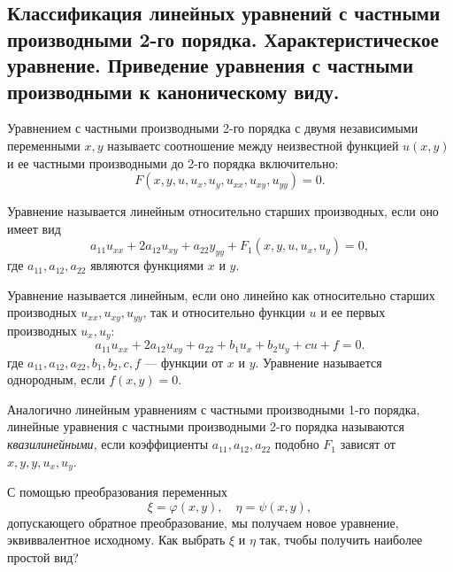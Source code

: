 \subsection{Классификация линейных уравнений с частными производными 2-го порядка. Характеристическое уравнение. Приведение уравнения с частными производными к каноническому виду.}

Уравнением с частными производными 2-го порядка с двумя независимыми переменными $x, y$ называетс соотношение между неизвестной функцией $ u(x, y)$ и ее частными производными до 2-го порядка включительно:
\begin{equation}
	F(x, y, u, u_x, u_y, u_{xx}, u_{xy}, u_{yy}) = 0.
\end{equation}

Уравнение называется линейным относительно старших производных, если оно имеет вид
\begin{equation} \label{SOlineq}
	a_{11} u_{xx} + 2 a_{12} u_{xy} + a_{22} y_{yy} + F_1(x, y, u, u_x, u_y) = 0,
\end{equation}
где $a_{11}, a_{12}, a_{22}$ являются функциями $x$ и $y$.

Уравнение называется линейным, если оно линейно как относительно старших производных $u_{xx}, u_{xy}, u_{yy}$, так и относительно функции $u$ и ее первых производных $u_x, u_y$:
\begin{equation} \label{SOeq}
	a_{11}  u_{xx} + 2 a_{12} u_{xy} + a_{22} + b_1 u_x + b_2 u_y + c u + f = 0. 
\end{equation}
где $a_{11}, a_{12}, a_{22}, b_1, b_2, c, f$ --- функции от $x$ и $y$. Уравнение называется однородным, если $f(x, y) = 0$.

Аналогично линейным уравнениям с частными производными 1-го порядка, линейные уравнения с частными производными 2-го порядка называются \textit{квазилинейными}, если коэффициенты $a_{11}, a_{12}, a_{22}$ подобно $F_1$ зависят от $x, y, y, u_x, u_y$. 

С помощью преобразования переменных
\begin{equation*}
	\xi = \varphi(x, y), \quad \eta = \psi(x, y),
\end{equation*}
допускающего обратное преобразование, мы получаем новое уравнение, эквиввалентное исходному. Как выбрать $\xi$ и $\eta$ так, тчобы получить наиболее простой вид?

